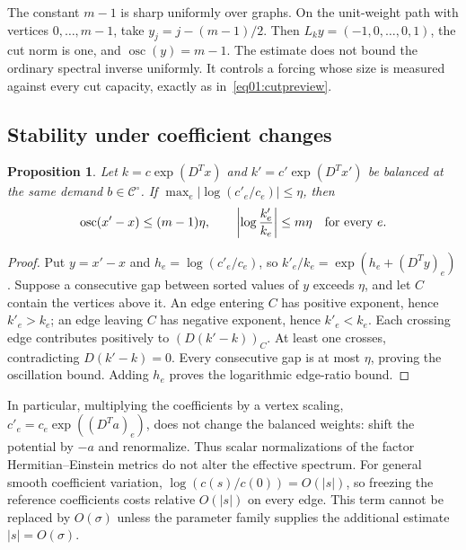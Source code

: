 \documentclass[11pt]{amsart}
\newtheorem{proposition}[theorem]{Proposition}
\theoremstyle{definition}
\theoremstyle{remark}
\newcommand{\osc}{\operatorname{osc}}
\newcommand{\cC}{\mathcal C}
\begin{document}
The constant \(m-1\) is sharp uniformly over graphs.
On the unit-weight path with vertices \(0,\ldots,m-1\), take
\(y_j=j-(m-1)/2\). Then \(L_ky=(-1,0,\ldots,0,1)\),
the cut norm is one, and \(\osc(y)=m-1\).
The estimate does not bound the ordinary spectral inverse
uniformly. It controls a forcing whose size is measured against
every cut capacity, exactly as in~\eqref{eq01:cutpreview}.

\subsection{Stability under coefficient changes}

\begin{proposition}\label{prop02:coefficient}
Let \(k=c\exp(D^Tx)\) and \(k'=c'\exp(D^Tx')\) be balanced
at the same demand \(b\in\cC^\circ\).
If \(\max_e|\log(c'_e/c_e)|\leq\eta\), then
\begin{equation}\label{eq02:coefficient}
 \osc(x'-x)\leq(m-1)\eta,\qquad
 \left|\log\frac{k'_e}{k_e}\right|\leq m\eta
 \quad\hbox{for every }e.
\end{equation}
\end{proposition}

\begin{proof}
Put \(y=x'-x\) and \(h_e=\log(c'_e/c_e)\), so
\(k'_e/k_e=\exp(h_e+(D^Ty)_e)\).
Suppose a consecutive gap between sorted values of \(y\)
exceeds \(\eta\), and let \(C\) contain the vertices above it.
An edge entering \(C\) has positive exponent, hence \(k'_e>k_e\);
an edge leaving \(C\) has negative exponent, hence \(k'_e<k_e\).
Each crossing edge contributes positively to
\((D(k'-k))_C\). At least one crosses, contradicting
\(D(k'-k)=0\).
Every consecutive gap is at most \(\eta\), proving the oscillation
bound. Adding \(h_e\) proves the logarithmic edge-ratio bound.
\end{proof}

In particular, multiplying the coefficients by a vertex scaling,
\(c'_e=c_e\exp((D^Ta)_e)\), does not change the balanced weights:
shift the potential by \(-a\) and renormalize.
Thus scalar normalizations of the factor Hermitian--Einstein
metrics do not alter the effective spectrum.
For general smooth coefficient variation,
\(\log(c(s)/c(0))=O(|s|)\), so freezing the reference coefficients
costs relative \(O(|s|)\) on every edge. This term cannot be
replaced by \(O(\sigma)\) unless the parameter family supplies
the additional estimate \(|s|=O(\sigma)\).

\end{document}
